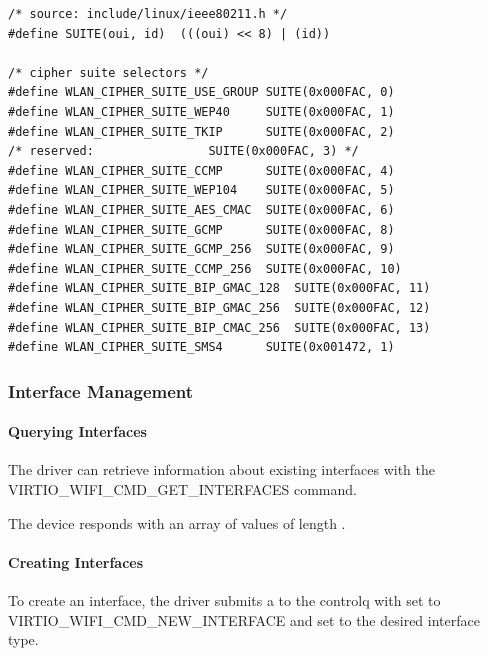 \begin{lstlisting}
/* source: include/linux/ieee80211.h */
#define SUITE(oui, id)	(((oui) << 8) | (id))

/* cipher suite selectors */
#define WLAN_CIPHER_SUITE_USE_GROUP	SUITE(0x000FAC, 0)
#define WLAN_CIPHER_SUITE_WEP40		SUITE(0x000FAC, 1)
#define WLAN_CIPHER_SUITE_TKIP		SUITE(0x000FAC, 2)
/* reserved: 				SUITE(0x000FAC, 3) */
#define WLAN_CIPHER_SUITE_CCMP		SUITE(0x000FAC, 4)
#define WLAN_CIPHER_SUITE_WEP104	SUITE(0x000FAC, 5)
#define WLAN_CIPHER_SUITE_AES_CMAC	SUITE(0x000FAC, 6)
#define WLAN_CIPHER_SUITE_GCMP		SUITE(0x000FAC, 8)
#define WLAN_CIPHER_SUITE_GCMP_256	SUITE(0x000FAC, 9)
#define WLAN_CIPHER_SUITE_CCMP_256	SUITE(0x000FAC, 10)
#define WLAN_CIPHER_SUITE_BIP_GMAC_128	SUITE(0x000FAC, 11)
#define WLAN_CIPHER_SUITE_BIP_GMAC_256	SUITE(0x000FAC, 12)
#define WLAN_CIPHER_SUITE_BIP_CMAC_256	SUITE(0x000FAC, 13)
#define WLAN_CIPHER_SUITE_SMS4		SUITE(0x001472, 1)
\end{lstlisting}

\subsubsection{Interface Management}\label{sec:Device Types / 802.11 Device / Device Operation / Interface Management}

\paragraph{Querying Interfaces}\label{sec:Device Types / 802.11 Device / Device Operation / Interface Management / Querying Interfaces}

The driver can retrieve information about existing interfaces with the VIRTIO_WIFI_CMD_GET_INTERFACES command.

The device responds with an array of  values of length .

\paragraph{Creating Interfaces}\label{sec:Device Types / 802.11 Device / Device Operation / Interface Management / Creating Interfaces}

To create an interface, the driver submits a  to the controlq with  set to VIRTIO_WIFI_CMD_NEW_INTERFACE and  set to the desired interface type.

